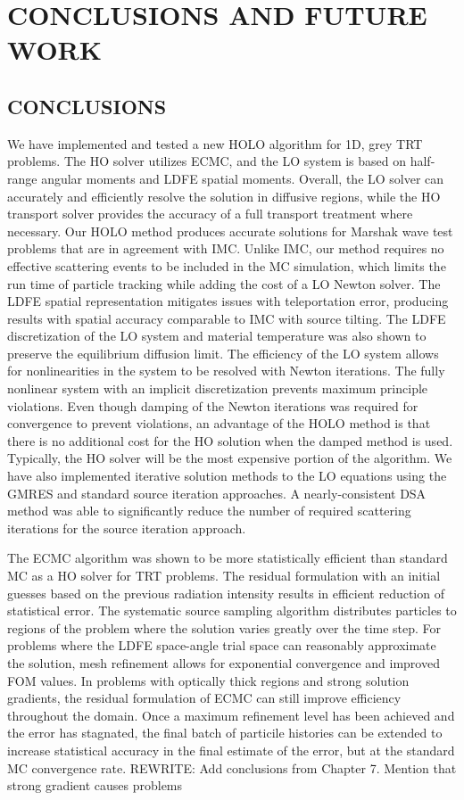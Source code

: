 \chapter{ \uppercase{Conclusions and Future Work} }
\label{chp:conclusions}

\section{CONCLUSIONS}

We have implemented and tested a new HOLO algorithm for 1D, grey TRT problems.  The HO
solver utilizes ECMC, and the LO system is based on half-range angular moments and LDFE
spatial moments. Overall, the LO solver can accurately and efficiently resolve the solution in diffusive regions, while the HO
transport solver provides the accuracy of a full transport treatment where necessary. 
Our HOLO method produces accurate solutions for Marshak wave test
problems that are in agreement with IMC.  Unlike IMC, our method requires no effective
scattering events to be included in the MC simulation, which limits the run time of
particle tracking while adding the cost of a LO Newton solver. The LDFE spatial
representation mitigates issues with teleportation error, producing results with spatial
accuracy comparable to IMC with source tilting.  The LDFE discretization of the LO system
and material temperature was also shown to preserve the equilibrium diffusion limit.  
The efficiency of the LO system allows for nonlinearities in the system to be resolved
with Newton iterations.  The fully nonlinear system with an implicit discretization
prevents maximum principle violations. Even though damping of the Newton iterations was
required for convergence to prevent violations, an advantage of the HOLO method is that
there is no additional cost for the HO solution when the damped method is used.
Typically, the HO solver will be the most expensive portion of the algorithm. 
We have also implemented iterative solution methods to the LO equations using the GMRES and
standard source iteration approaches.  A nearly-consistent DSA method was able to
significantly reduce the number of required scattering iterations for the source iteration
approach. 

The ECMC algorithm was shown to be more statistically efficient than standard MC as a HO
solver for TRT problems.  The residual formulation with an initial guesses based on the
previous radiation intensity results in efficient reduction of statistical error.  The
systematic source sampling algorithm distributes particles to regions of the problem where the
solution varies greatly over the time step.  For problems where the LDFE space-angle trial space
can reasonably approximate the solution, mesh refinement allows for exponential
convergence and improved FOM values.   In problems with optically
thick regions and strong solution gradients, the residual formulation of ECMC can still
improve efficiency throughout the domain.  Once a maximum refinement level has been
achieved and the error has stagnated, the final batch of particile histories can be 
extended to increase statistical accuracy in the final estimate of the error, but at the
standard MC convergence rate.
REWRITE: Add conclusions from Chapter 7. Mention that strong gradient causes problems

